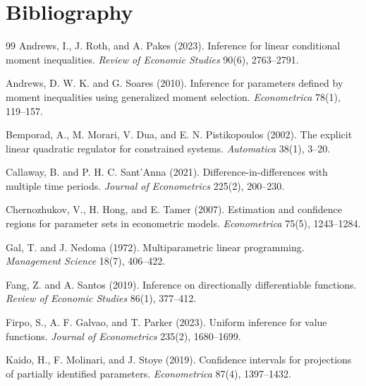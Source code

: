 \documentclass[11pt]{article}
\theoremstyle{definition}
\theoremstyle{plain}
\theoremstyle{remark}
\begin{document}
\section*{Bibliography}
\begin{thebibliography}{99}
Andrews, I., J. Roth, and A. Pakes (2023).
\newblock Inference for linear conditional moment inequalities.
\newblock \emph{Review of Economic Studies} 90(6), 2763--2791.

Andrews, D. W. K. and G. Soares (2010).
\newblock Inference for parameters defined by moment inequalities using
generalized moment selection.
\newblock \emph{Econometrica} 78(1), 119--157.

Bemporad, A., M. Morari, V. Dua, and E. N. Pistikopoulos (2002).
\newblock The explicit linear quadratic regulator for constrained systems.
\newblock \emph{Automatica} 38(1), 3--20.

Callaway, B. and P. H. C. Sant'Anna (2021).
\newblock Difference-in-differences with multiple time periods.
\newblock \emph{Journal of Econometrics} 225(2), 200--230.

Chernozhukov, V., H. Hong, and E. Tamer (2007).
\newblock Estimation and confidence regions for parameter sets in econometric
models.
\newblock \emph{Econometrica} 75(5), 1243--1284.

Gal, T. and J. Nedoma (1972).
\newblock Multiparametric linear programming.
\newblock \emph{Management Science} 18(7), 406--422.

Fang, Z. and A. Santos (2019).
\newblock Inference on directionally differentiable functions.
\newblock \emph{Review of Economic Studies} 86(1), 377--412.

Firpo, S., A. F. Galvao, and T. Parker (2023).
\newblock Uniform inference for value functions.
\newblock \emph{Journal of Econometrics} 235(2), 1680--1699.

Kaido, H., F. Molinari, and J. Stoye (2019).
\newblock Confidence intervals for projections of partially identified
parameters.
\newblock \emph{Econometrica} 87(4), 1397--1432.


\end{thebibliography}
\end{document}
